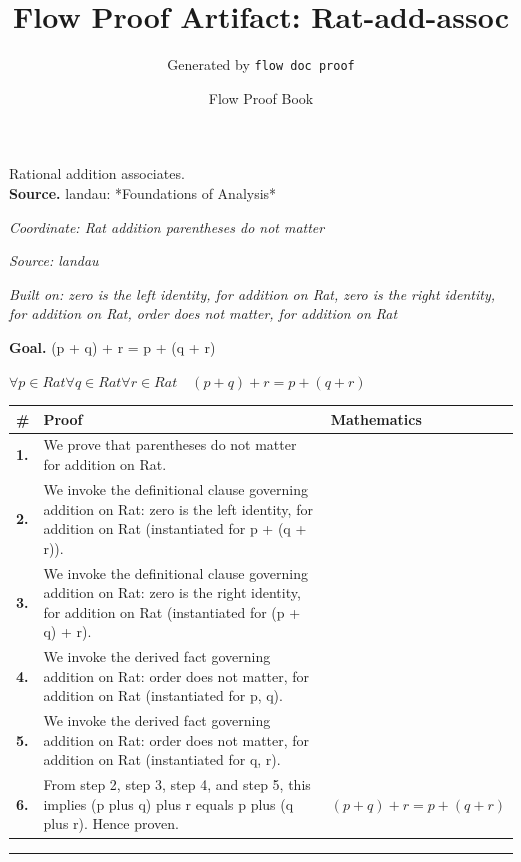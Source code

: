 \documentclass[11pt]{article}
\title{Flow Proof Artifact: Rat-add-assoc}
\author{Generated by \texttt{flow doc proof}}
\date{Flow Proof Book}
\theoremstyle{definition}
\begin{document}
\maketitle
Rational addition associates.\\[0.5em]
\textbf{Source.} landau: *Foundations of Analysis*\\[0.5em]
\bigskip
{}\par
\smallskip\noindent\textit{Coordinate: Rat \cdot addition \cdot parentheses do not matter}\par
\smallskip\noindent\textit{Source: landau}\par
\smallskip\noindent\textit{Built on: zero is the left identity, for addition on Rat, zero is the right identity, for addition on Rat, order does not matter, for addition on Rat}\par
\medskip
\noindent\textbf{Goal.} (p + q) + r = p + (q + r)\par
\noindent$\displaystyle \forall p \in Rat \forall q \in Rat \forall r \in Rat\quad (p + q) + r = p + (q + r)$\par
\medskip
\noindent
\begin{tabular}{@{} >{\raggedright\arraybackslash}p{} >{\raggedright\arraybackslash}p{} >{\raggedleft\arraybackslash}p{} @{}}
\textbf{\#} & \textbf{Proof} & \textbf{Mathematics} \\
\midrule
\textbf{1.} & We prove that parentheses do not matter for addition on Rat. & \\[0.45em]
\textbf{2.} & We invoke the definitional clause governing addition on Rat: zero is the left identity, for addition on Rat (instantiated for p + (q + r)). & \\[0.45em]
\textbf{3.} & We invoke the definitional clause governing addition on Rat: zero is the right identity, for addition on Rat (instantiated for (p + q) + r). & \\[0.45em]
\textbf{4.} & We invoke the derived fact governing addition on Rat: order does not matter, for addition on Rat (instantiated for p, q). & \\[0.45em]
\textbf{5.} & We invoke the derived fact governing addition on Rat: order does not matter, for addition on Rat (instantiated for q, r). & \\[0.45em]
\textbf{6.} & From step 2, step 3, step 4, and step 5, this implies (p plus q) plus r equals p plus (q plus r). Hence proven. & $\displaystyle (p + q) + r = p + (q + r)$ \\[0.45em]
\bottomrule
\end{tabular}
\label{thm:Rat-addition-parentheses_do_not_matter}
\par\medskip\hrule
\end{document}
